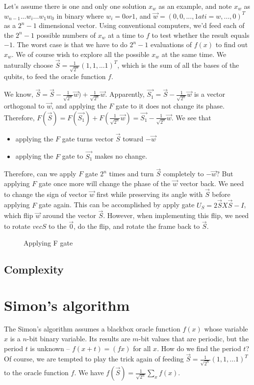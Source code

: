 \documentclass[oneside, letter, 12pt]{book}
\begin{document}
Let's assume there is one and only one solution $x_w$ as an example, and note $x_w$ as $w_{n-1}...w_i...w_1 w_0$ in binary where $w_i = 0 or 1$, and $\Vec{w} = (0, 0, ..., 1 at i=w, ..., 0)^T$ as a $2^n-1$ dimensional vector. Using conventional computers, we'd feed each of the $2^n -1$ possible numbers of $x_w$ at a time to $f$ to test whether the result equals $-1$. The worst case is that we have to do $2^n-1$ evaluations of $f(x)$ to find out $x_w$. We of course wish to explore all the possible $x_w$ at the same time. We naturally choose $\vec{S} = \frac 1 {\sqrt{2^n}} (1, 1, ...1)^T$, which is the sum of all the bases of the qubits, to feed the oracle function $f$.

We know, $\vec{S} = \vec{S} - \frac 1 {\sqrt{2^n}} \vec{w}) + \frac 1  {\sqrt{2^n}} \vec{w}$. Apparently, $\vec{S_1}  = \vec{S} - \frac 1 {\sqrt{2^n}} \vec{w}$ is a vector orthogonal to $\vec{w}$, and applying the $F$ gate to it does not change its phase. Therefore, $F(\vec{S}) = F(\vec{S_1}) + F(\frac 1  {\sqrt{2^n}} \vec{w})  = \vec{S_1} - \frac 1 {\sqrt{2^n}} \vec{w}$. We see that 
\begin{itemize}
    \item applying the $F$ gate turns vector $\vec{S}$ toward $-\vec{w}$
    \item applying the $F$ gate to $\vec{S_1}$ makes no change.
\end{itemize}
Therefore, can we apply $F$ gate $2^n$ times and turn $\vec{S}$ completely to $-\vec{w}$? But applying $F$ gate once more will change the phase of the $\vec{w}$ vector back. We need to change the sign of vector $\vec{w}$ first while preserving its angle with $\vec{S}$ before applying $F$ gate again. This can be accomplished by apply gate $U_S = 2 \vec{S}X\vec{S} -I$, which flip $\vec{w}$ around the vector $\vec{S}$. However, when implementing this flip, we need to rotate $vec{S}$ to the $\vec{0}$, do the flip, and rotate the frame back to $\vec{S}$.

\begin{figure}[ht]\label{Grover}

\caption{Applying F gate}
\end{figure}

\subsection{Complexity}

\section{Simon's algorithm}
The Simon's algorithm assumes a blackbox oracle function $f(x)$ whose variable $x$ is a $n$-bit binary variable. Its results are $m$-bit values that are periodic, but the period $t$ is unknown -- $f(x+t)=(fx)$ for all $x$. How do we find the period $t$? Of course, we are tempted to play the trick again of feeding $\vec{S} = \frac 1 {\sqrt{2^n}} (1, 1, ...1)^T$ to the oracle function $f$. We have
$f(\vec{S}) = \frac 1  {\sqrt{2^n}} \sum_x f(x)$.
\end{document}
